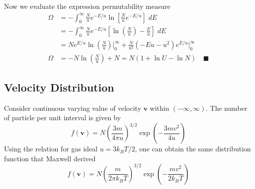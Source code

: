 \documentclass[../../../Main.tex]{subfiles}
\begin{document}
Now we evaluate the expression permutability measure
\begin{align*}
    \Omega&=-\int_{0}^{\infty}\frac{N}{u}e^{-E/u}\ln\left[\frac{N}{u}e^{-E/u}\right]\;dE\\
    &=-\int_{0}^{\infty}\frac{N}{u}e^{-E/u}\left[\ln\left(\frac{N}{u}\right)-\frac{E}{u}\right]\;dE\\
    &=Ne^{E/u}\ln\left(\frac{N}{u}\right)\bigg|_{0}^{\infty}+\frac{N}{u^2}\left(-Eu-u^2\right)e^{E/u}\bigg|_{0}^{\infty}\\
    \Omega&=-N\ln\left(\frac{N}{u}\right)+N=N(1+\ln U-\ln N)\quad\blacksquare
\end{align*}

\subsection*{Velocity Distribution}
Consider continuous varying value of velocity $\mathbf{v}$ within $(-\infty,\infty)$. The number of particle per unit interval is given by 
\begin{equation*}
    f(\mathbf{v})=N\left(\frac{3m}{4\pi u}\right)^{3/2}\exp\left(-\frac{3mv^2}{4u}\right)
\end{equation*}
Using the relation for gas ideal $u=3k_BT/2$, one can obtain the same distribution function that Maxwell derived
\begin{equation*}
    f(\mathbf{v})=N\left(\frac{m}{2\pi k_B T}\right)^{3/2}\exp\left(-\frac{m v^2}{2k_B T}\right)
\end{equation*} 
\end{document}
